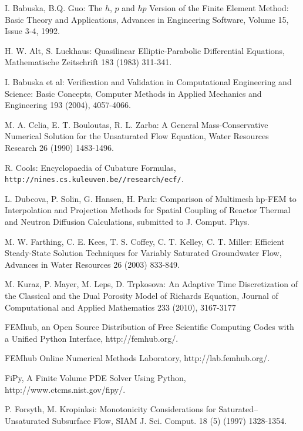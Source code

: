 \documentclass[final,3p,times,twocolumn]{elsarticle}
\begin{document}

\begin{thebibliography}{00}

I. Babuska, B.Q. Guo: The $h$, $p$ and $hp$ Version of the Finite Element Method: Basic Theory and Applications, 
Advances in Engineering Software, Volume 15, Issue 3-4, 1992.

     H. W. Alt, S. Luckhaus: Quasilinear Elliptic-Parabolic Differential Equations, Mathematische Zeitschrift 183 (1983) 311-341.

I. Babuska et al: Verification and Validation in Computational Engineering and Science: Basic Concepts,
Computer Methods in Applied Mechanics and Engineering 193 (2004), 4057-4066.

M. A. Celia, E. T. Bouloutas, R. L. Zarba: A General Mass-Conservative Numerical Solution for the Unsaturated Flow Equation, Water Resources Research 26 (1990) 1483-1496.

    R. Cools: Encyclopaedia of Cubature Formulas, {\tt http://nines.cs.kuleuven.be//research/ecf/}.

L. Dubcova, P. Solin, G. Hansen, H. Park: Comparison of Multimesh hp-FEM to Interpolation and 
Projection Methods for Spatial Coupling of Reactor Thermal and Neutron Diffusion Calculations, 
submitted to J. Comput. Phys.

M. W. Farthing, C. E. Kees, T. S. Coffey, C. T. Kelley, C. T. Miller: Efficient Steady-State Solution Techniques for Variably Saturated Groundwater Flow, Advances in Water Resources 26 (2003) 833-849.

  M. Kuraz, P. Mayer, M. Leps, D. Trpkosova: An Adaptive Time Discretization of the Classical and the Dual Porosity Model of Richards Equation, Journal of Computational and 
Applied Mathematics 233 (2010), 3167-3177

FEMhub, an Open Source Distribution of Free Scientific Computing Codes 
with a Unified Python Interface, http://femhub.org/.

FEMhub Online Numerical Methods Laboratory, http://lab.femhub.org/.

FiPy, A Finite Volume PDE Solver Using Python, http://www.ctcms.nist.gov/fipy/.

P. Forsyth, M. Kropinksi: Monotonicity Considerations for Saturated–
Unsaturated Subsurface Flow, SIAM J. Sci. Comput. 18 (5) (1997) 1328-1354.


\end{thebibliography}
\end{document}

